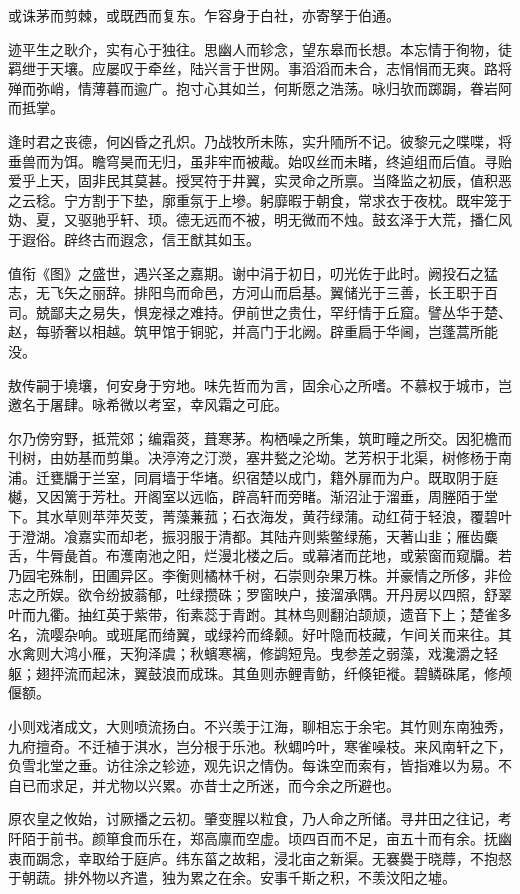 \documentclass[12pt,UTF8]{ctexbook}
\begin{document}
或诛茅而剪棘，或既西而复东。乍容身于白社，亦寄孥于伯通。

迹平生之耿介，实有心于独往。思幽人而轸念，望东皋而长想。本忘情于徇物，徒羁绁于天壤。应屡叹于牵丝，陆兴言于世网。事滔滔而未合，志悁悁而无爽。路将殚而弥峭，情薄暮而逾广。抱寸心其如兰，何斯愿之浩荡。咏归欤而踯跼，眷岩阿而抵掌。

逢时君之丧德，何凶昏之孔炽。乃战牧所未陈，实升陑所不记。彼黎元之喋喋，将垂兽而为饵。瞻穹昊而无归，虽非牢而被胾。始叹丝而未睹，终逌组而后值。寻贻爱乎上天，固非民其莫甚。授冥符于井翼，实灵命之所禀。当降监之初辰，值积恶之云稔。宁方割于下垫，廓重氛于上墋。躬靡暇于朝食，常求衣于夜枕。既牢笼于妫、夏，又驱驰乎轩、顼。德无远而不被，明无微而不烛。鼓玄泽于大荒，播仁风于遐俗。辟终古而遐念，信王猷其如玉。

值衔《图》之盛世，遇兴圣之嘉期。谢中涓于初日，叨光佐于此时。阙投石之猛志，无飞矢之丽辞。排阳鸟而命邑，方河山而启基。翼储光于三善，长王职于百司。兢鄙夫之易失，惧宠禄之难持。伊前世之贵仕，罕纡情于丘窟。譬丛华于楚、赵，每骄奢以相越。筑甲馆于铜驼，并高门于北阙。辟重扃于华阃，岂蓬蒿所能没。

敖传嗣于墝壤，何安身于穷地。味先哲而为言，固余心之所嗜。不慕权于城市，岂邀名于屠肆。咏希微以考室，幸风霜之可庇。

尔乃傍穷野，抵荒郊；编霜菼，葺寒茅。构栖噪之所集，筑町疃之所交。因犯檐而刊树，由妨基而剪巢。决渟洿之汀濙，塞井甃之沦坳。艺芳枳于北渠，树修杨于南浦。迁甕牖于兰室，同肩墙于华堵。织宿楚以成门，籍外扉而为户。既取阴于庭樾，又因篱于芳杜。开阁室以远临，辟高轩而旁睹。渐沼沚于溜垂，周塍陌于堂下。其水草则苹萍芡芰，菁藻蒹菰；石衣海发，黄荇绿蒲。动红荷于轻浪，覆碧叶于澄湖。飡嘉实而却老，振羽服于清都。其陆卉则紫鳖绿葹，天著山韭；雁齿麋舌，牛脣彘首。布濩南池之阳，烂漫北楼之后。或幕渚而芘地，或萦窗而窥牖。若乃园宅殊制，田圃异区。李衡则橘林千树，石崇则杂果万株。并豪情之所侈，非俭志之所娱。欲令纷披蓊郁，吐绿攒硃；罗窗映户，接溜承隅。开丹房以四照，舒翠叶而九衢。抽红英于紫带，衔素蕊于青跗。其林鸟则翻泊颉颃，遗音下上；楚雀多名，流嘤杂响。或班尾而绮翼，或绿衿而绛颡。好叶隐而枝藏，乍间关而来往。其水禽则大鸿小雁，天狗泽虞；秋蠙寒褵，修鹢短凫。曳参差之弱藻，戏瀺灂之轻躯；翅抨流而起沫，翼鼓浪而成珠。其鱼则赤鲤青鲂，纤倏钜褷。碧鳞硃尾，修颅偃额。

小则戏渚成文，大则喷流扬白。不兴羡于江海，聊相忘于余宅。其竹则东南独秀，九府擅奇。不迁植于淇水，岂分根于乐池。秋蜩吟叶，寒雀噪枝。来风南轩之下，负雪北堂之垂。访往涂之轸迹，观先识之情伪。每诛空而索有，皆指难以为易。不自已而求足，并尤物以兴累。亦昔士之所迷，而今余之所避也。

原农皇之攸始，讨厥播之云初。肇变腥以粒食，乃人命之所储。寻井田之往记，考阡陌于前书。颜箪食而乐在，郑高廪而空虚。顷四百而不足，亩五十而有余。抚幽衷而跼念，幸取给于庭庐。纬东菑之故耜，浸北亩之新渠。无褰爨于晓蓐，不抱惄于朝蔬。排外物以齐遣，独为累之在余。安事千斯之积，不羡汶阳之墟。
\end{document}
